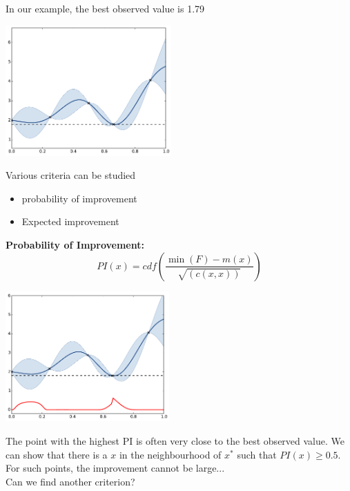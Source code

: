 \documentclass{beamer}
\begin{document}
\begin{frame}{}
In our example, the best observed value is 1.79
\begin{center}
\includegraphics[height=5cm]{figures/python/ego_improv}
\end{center}
Various criteria can be studied
\begin{itemize}
	\item probability of improvement
	\item Expected improvement
\end{itemize}
\end{frame}

\begin{frame}{}
\textbf{Probability of Improvement:}
$$PI(x) = cdf \left(\frac{\min(F) - m(x)}{\sqrt{(c(x,x))}} \right)$$
\begin{center}
\includegraphics[height=5cm]{figures/python/ego_PI}
\end{center}
\end{frame}

\begin{frame}{}
The point with the highest PI is often very close to the best observed value. We can show that there is a $x$ in the neighbourhood of $x^*$ such that $PI(x) \geq 0.5$.\\
\vspace{5mm}
For such points, the improvement cannot be large... \\
\vspace{3mm}
Can we find another criterion?
\end{frame}
\end{document}
